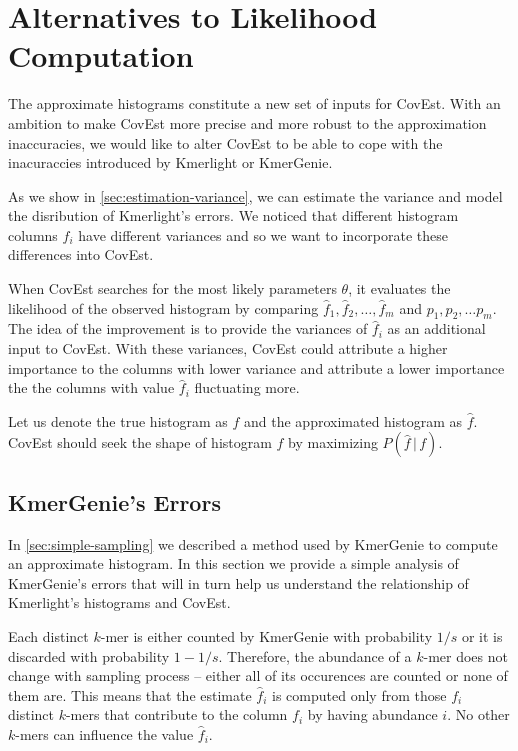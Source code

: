 \section{Alternatives to Likelihood Computation}
The approximate histograms constitute a new set of inputs for CovEst.
With an ambition to make CovEst more precise and more robust to the approximation inaccuracies,
we would like to alter CovEst to be able to cope with the inacuraccies introduced by
Kmerlight or KmerGenie.

As we show in \ref{sec:estimation-variance}, we can estimate the variance and 
model the disribution of Kmerlight's errors. We noticed that different histogram columns $f_i$
have different variances and so we want to incorporate these differences into CovEst.

When CovEst searches for the most likely parameters $\theta$, it evaluates the likelihood
of the observed histogram by comparing $\hat f_1, \hat f_2, \dots, \hat f_m$ and 
$p_1, p_2, \dots p_m$. The idea of the improvement is to provide the variances of 
$\hat f_i$ as an additional input to CovEst. With these variances, CovEst could
attribute a higher importance to the columns with lower variance and attribute a 
lower importance the the columns with value $\hat f_i$ fluctuating more.

Let us denote the true histogram as $f$ and the approximated histogram as $\hat f$.
CovEst should seek the shape of histogram $f$ by maximizing $P(\hat f \,|\, f)$. 

\subsection{KmerGenie's Errors}
\label{sec:kmergenie-errors}
In \ref{sec:simple-sampling} we described a method used by KmerGenie to compute 
an approximate histogram. In this section we provide a simple analysis of KmerGenie's
errors that will in turn help us understand the relationship of Kmerlight's histograms
and CovEst.

Each distinct $k$-mer is either counted by KmerGenie with probability $1/s$ or it is discarded 
with probability $1 - 1/s$. Therefore, the abundance of a $k$-mer does not change 
with sampling process -- either all of its occurences are counted or none of them are.
This means that the estimate $\hat f_i$ is computed only from those $f_i$ distinct $k$-mers 
that contribute to the column $f_i$ by having abundance $i$. No other $k$-mers can
influence the value $\hat f_i$.

